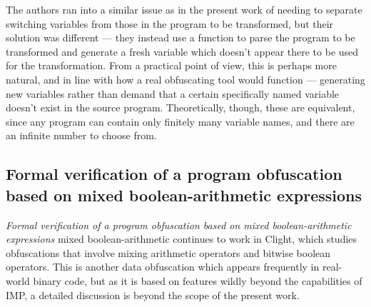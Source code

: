 \documentclass[compsoc,conference,a4paper,10pt,times]{IEEEtran}
\begin{document}
\par The authors ran into a similar issue as in the present work of needing to separate switching variables from those in the program to be transformed, but their solution was different --- they instead use a function to parse the program to be transformed and generate a fresh variable which doesn't appear there to be used for the transformation.  From a practical point of view, this is perhaps more natural, and in line with how a real obfuscating tool would function --- generating new variables rather than demand that a certain specifically named variable doesn't exist in the source program.  Theoretically, though, these are equivalent, since any program can contain only finitely many variable names, and there are an infinite number to choose from.

\subsection*{Formal verification of a program obfuscation based on mixed boolean-arithmetic expressions}
\par \emph{Formal verification of a program obfuscation based on mixed boolean-arithmetic expressions} \cite{Blazy3} mixed boolean-arithmetic continues to work in Clight, which studies obfuscations that involve mixing arithmetic operators and bitwise boolean operators.  This is another data obfuscation which appears frequently in real-world binary code, but as it is based on features wildly beyond the capabilities of IMP, a detailed discussion is beyond the scope of the present work.
\end{document}
